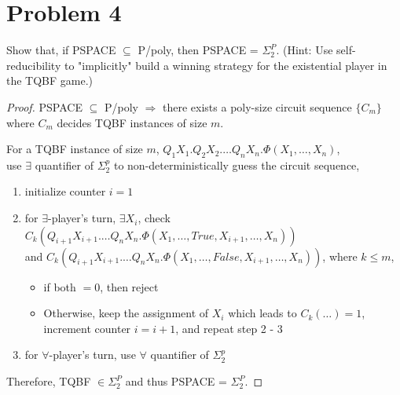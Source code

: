 \documentclass[twoside,11pt]{homework}
\begin{document}
\section*{Problem 4}

Show that, if PSPACE $\subseteq$ P/poly, then PSPACE = $\Sigma_2^P$.
(Hint: Use self-reducibility to "implicitly" build a winning strategy for the
existential player in the TQBF game.)

\begin{proof}
  PSPACE $\subseteq$ P/poly $\Rightarrow$ there exists a poly-size circuit sequence $\{C_m\}$ where
  $C_m$ decides TQBF instances of size $m$.

  For a TQBF instance of size $m$, $Q_1 X_1. Q_2 X_2. \dots Q_n X_n. \Phi(X_1,
  \dots, X_n)$,\\
  use $\exists$ quantifier of $\Sigma_2^p$ to non-deterministically guess the circuit
  sequence,
  \begin{enumerate}
  \item initialize counter $i = 1$
  \item for $\exists$-player's turn, $\exists X_i$, check $C_k(Q_{i+1}X_{i+1}. \dots Q_n X_n.
    \Phi(X_1, \dots, True,
    X_{i+1}, \dots, X_n))$\\
    and $C_k(Q_{i+1}X_{i+1}. \dots Q_n X_n. \Phi(X_1, \dots, False, X_{i+1}, \dots, X_n))$,
    where $k \le m$,
    \begin{itemize}
    \item if both $= 0$, then reject
    \item Otherwise, keep the assignment of $X_i$ which leads to $C_k(\dots) =
      1$, increment counter $i = i + 1$, and repeat step 2 - 3
    \end{itemize}
  \item for $\forall$-player's turn, use $\forall$ quantifier of $\Sigma_2^p$
  \end{enumerate}

  Therefore, TQBF $\in \Sigma_2^P$ and thus PSPACE = $\Sigma_2^P$.
\end{proof}
\end{document}

